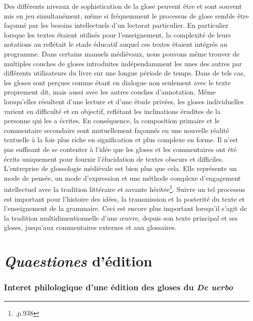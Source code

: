 \documentclass[a4paper, twoside, 12pt]{book}
\begin{document}
Des différents niveaux de sophistication de la glose peuvent être et sont souvent mis en jeu simultanément, même si fréquemment le processus de glose semble être façonné par les besoins intellectuels d'un lectorat particulier. En particulier lorsque les textes étaient utilisés pour l'enseignement, la complexité de leurs notations an reflétait le stade éducatif auquel ces textes étaient intégrés au programme. Dans certains manuels médiévaux, nous pouvons même trouver de multiples couches de gloses introduites indépendamment les unes des autres par différents utilisateurs du livre sur une longue période de temps. Dans de tels cas, les gloses sont perçues comme étant en dialogue non seulement avec le texte proprement dit, mais aussi avec les autres couches d'annotation. Même lorsqu'elles résultent d'une lecture et d'une étude privées, les gloses individuelles varient en difficulté et en objectif, reflétant les inclinations érudites de la personne qui les a écrites. En conséquence, la composition primaire et le commentaire secondaire sont mutuellement façonnés en une nouvelle réalité textuelle à la fois plus riche en signification et plus complexe en forme. Il n'est pas suffisant de se contenter à l'idée que les gloses et les commentaires ont été écrits uniquement pour fournir l'élucidation de textes obscurs et difficiles. L'entreprise de glossologie médiévale est bien plus que cela. Elle représente un mode de pensée, un mode d'expression et une méthode complexe d'engagement intellectuel avec la tradition littéraire et savante héritée\footnote{\cite{dinkova2020text},p.938}. Suivre un tel processus est important pour l'histoire des idées, la transmission et la posterité du texte et l'enseignement de la grammaire. Ceci est encore plus important lorsqu'il s'agit de la tradition multidimentionnelle d'une œuvre, depuis son texte principal et ses gloses, jusqu'aux commentaires externes et aux glossaires.


\section{\textit{Quaestiones} d'édition}

\subsubsection{Interet philologique d'une édition des gloses du \textit{De uerbo}}
\end{document}
